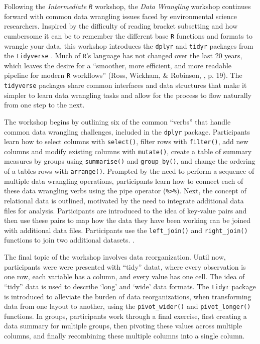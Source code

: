 \documentclass[12pt]{article}
\begin{document}
\quad Following the \emph{Intermediate \texttt{R}} workshop, the \emph{Data 
Wrangling} workshop continues forward with common data wrangling issues faced by
environmental science researchers. Inspired by the difficulty of reading bracket
subsetting and how cumbersome it can be to remember the different base 
\texttt{R} functions and formats to wrangle your data, this workshop introduces 
the \texttt{dplyr} \citep{dpylr} and \texttt{tidyr} \citep{tidyr} packages from
the \texttt{tidyverse} \citep{tidyverse}. Much of \texttt{R}'s language has not
changed over the last 20 years, which leaves the desire for a ``smoother, more
efficient, and more readable pipeline for modern \texttt{R} workflows'' (Ross, 
Wickham, \& Robinson, \citeyear{tidytools}, p. 19). The \texttt{tidyverse}
packages share common interfaces and data structures that make it simpler to
learn data wrangling tasks and allow for the process to flow naturally from one
step to the next. 



\quad The workshop begins by outlining six of the common ``verbs'' that handle
common data wrangling challenges, included in the  \texttt{dplyr} package. 
Participants learn how to select columns with \texttt{select()}, filter rows 
with \texttt{filter()}, add new columns and modify existing columns with 
\texttt{mutate()}, create a table of summary measures by groups using 
\texttt{summarise()} and \texttt{group\_by()}, and change the ordering of a 
tables rows with \texttt{arrange()}. Prompted by the need to perform a sequence
of multiple data wrangling operations, participants learn how to connect each of
these data wrangling verbs using the pipe operator (\texttt{\%>\%}). Next, the
concept of relational data is outlined, motivated by the need to
integrate additional data files for analysis. Participants are introduced to the
idea of key-value pairs and then use these pairs to map how the data they have
been working can be joined with additional data files. Participants use the 
\texttt{left\_join()} and  \texttt{right\_join()} functions to join two 
additional datasets. . 

\quad The final topic of the workshop involves data reorganization. Until now, 
participants were were presented with ``tidy'' datat, where every observation is
one row, each variable has a column, and every value has one cell. The idea of 
``tidy'' data is used to describe `long' and `wide' data formats. The 
\texttt{tidyr} package is introduced to alleviate the burden of data 
reorganizations, when transforming data from one layout to another, using the 
\texttt{pivot\_wider()} and \texttt{pivot\_longer()} functions. In groups, 
participants work through a final exercise, first creating a data summary for
multiple groups, then pivoting these values across multiple columns, and finally
recombining these multiple columns into a single column. 
\end{document}
